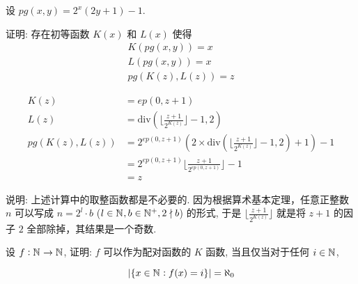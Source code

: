 \begin{problem}
设 $pg(x, y) = 2^x(2y + 1) - 1$.

证明: 存在初等函数 $K(x)$ 和 $L(x)$ 使得
\begin{align*}
K(pg(x, y)) = x \\
L(pg(x, y)) = x \\
pg(K(z), L(z)) = z    
\end{align*}
\end{problem}

\begin{solution}
\begin{align*}
K(z) & = ep(0, z + 1) \\
L(z) & = \text{div}(\Big \lfloor \frac{z+1}{2^{K(z)}} \Big \rfloor - 1, 2) \\
pg(K(z), L(z)) & = 2^{ep(0, z + 1)} (2 \times \text{div}(\Big \lfloor \frac{z+1}{2^{K(z)}} \Big \rfloor - 1, 2) + 1) - 1 \\
& = 2^{ep(0, z + 1)} \Big \lfloor \frac{z+1}{2^{ep(0, z + 1)}} \Big \rfloor - 1 \\
& = z
\end{align*}

说明: 上述计算中的取整函数都是不必要的. 因为根据算术基本定理，任意正整数 $n$ 可以写成 $n = 2^l \cdot b$ ($l \in \mathbb{N}^{}, b \in \mathbb{N}^{+}, 2 \nmid b$) 的形式, 于是 $\Big \lfloor \frac{z+1}{2^{K(z)}} \Big \rfloor$ 就是将 $z + 1$ 的因子 $2$ 全部除掉，其结果是一个奇数.
\end{solution}

\begin{problem}
设 $f : \mathbb{N}^{} \to \mathbb{N}^{}$, 证明: $f$ 可以作为配对函数的 $K$ 函数, 当且仅当对于任何 $i \in \mathbb{N}^{}$,

\[
|\{ x \in \mathbb{N}^{} : f(x) = i \}| = \aleph_0
\]
\end{problem}

